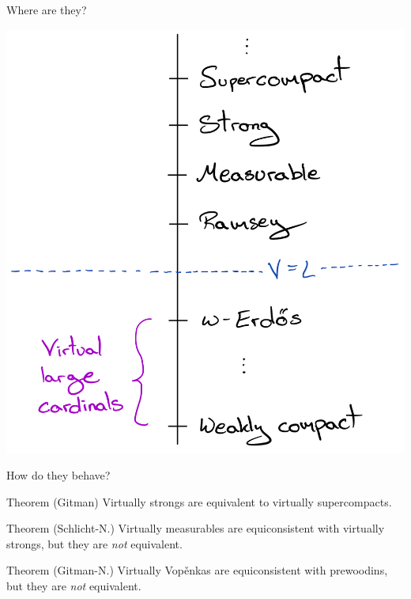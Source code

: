\documentclass{beamer}
\begin{document}
\begin{frame}{Where are they?}
  \begin{center}
    \includegraphics[scale=.16]{gfx/hierarchy.jpg}
  \end{center}
\end{frame}

\begin{frame}{How do they behave?}
  \begin{block}{Theorem (Gitman)}
    Virtually strongs are equivalent to virtually supercompacts.
  \end{block}

  \pause

  \begin{block}{Theorem (Schlicht-N.)}
    Virtually measurables are equiconsistent with virtually strongs, but they are \textit{not} equivalent.
  \end{block}
  
  \pause

  \begin{block}{Theorem (Gitman-N.)}
    Virtually Vop\v enkas are equiconsistent with \alert{prewoodins}, but they are \textit{not} equivalent.
  \end{block}
\end{frame}
\end{document}
